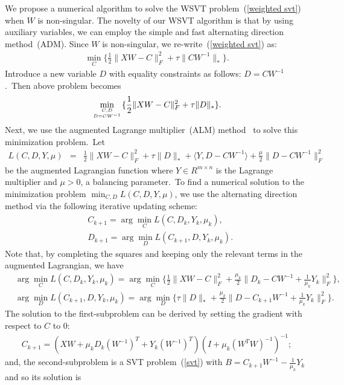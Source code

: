 \documentclass[twoside,11pt]{article}
\begin{document}
We propose a numerical algorithm to solve the WSVT problem~(\ref{weighted svt}) when $W$ is non-singular. The novelty of our WSVT algorithm is that by using auxiliary variables, we can employ the simple and fast alternating direction method~(ADM). Since $W$ is non-singular, we re-write~(\ref{weighted svt}) as:
\begin{eqnarray*}
	\min_C\{\frac{1}{2}\|XW-C\|_F^2+\tau \|CW^{-1}\|_*\}.
\end{eqnarray*}
Introduce a new variable $D$ with equality constraints as follows: $D=CW^{-1}$.~Then above problem becomes
\begin{eqnarray}
\min_{C,D\atop{D=CW^{-1}}}\{\frac{1}{2}\|XW-C\|_F^2+\tau \|D\|_*\}.
\end{eqnarray}
Next, we use the augmented Lagrange multiplier~(ALM) method~\citep{LinChenMa, sboyd} to solve this minimization problem.~Let
\begin{eqnarray*}
	L(C,D,Y,\mu)&=&\frac{1}{2}\|XW-C\|_F^2+\tau \|D\|_*+\langle Y,D-CW^{-1}\rangle+\frac{\mu}{2}\|D-CW^{-1}\|^2_F
\end{eqnarray*}
be the augmented Lagrangian function where $Y\in R^{m\times n}$ is the Lagrange multiplier and $\mu>0$, a balancing parameter.~To find a numerical solution to the minimization problem $\displaystyle{\min_{C,D} L(C,D,Y,\mu)}$, we use the alternating direction method via the following iterative updating scheme: \begin{eqnarray*}
	& C_{k+1}=\displaystyle{\arg\min_C L(C,D_k,Y_k,\mu_k)},\\
	& D_{k+1}=\displaystyle{\arg\min_D L(C_{k+1},D,Y_k,\mu_k)}.
\end{eqnarray*}
Note that, by completing the squares and keeping only the relevant terms in the augmented Lagrangian, we have
 \begin{eqnarray*}
 	& \displaystyle{\arg\min_C L(C,D_k,Y_k,\mu_k)}=\displaystyle{\arg\min_C\{\frac{1}{2}\|XW-C\|_F^2+\frac{\mu_k}{2}\|D_k-CW^{-1}+\frac{1}{\mu_k}Y_k\|_F^2\}},\\
 	& \displaystyle{\arg\min_D L(C_{k+1},D,Y_k,\mu_k)}=\displaystyle{\arg\min_D\{\tau\|D\|_*+\frac{\mu_k}{2}\|D-C_{k+1}W^{-1}+\frac{1}{\mu_k}Y_k\|_F^2\}}.
 \end{eqnarray*}
The solution to the first-subproblem can be derived by setting the gradient with respect to $C$ to $0$:
\begin{align*}
C_{k+1} = (XW + \mu_k{D_k} (W^{-1})^T+Y_k(W^{-1})^T)(I + \mu_k(W^TW)^{-1})^{-1};
\end{align*}
and, the second-subproblem is a SVT problem~(\ref{svt}) with $B=C_{k+1}W^{-1}-\frac{1}{\mu_k}Y_k$ and so its solution is
\end{document}
